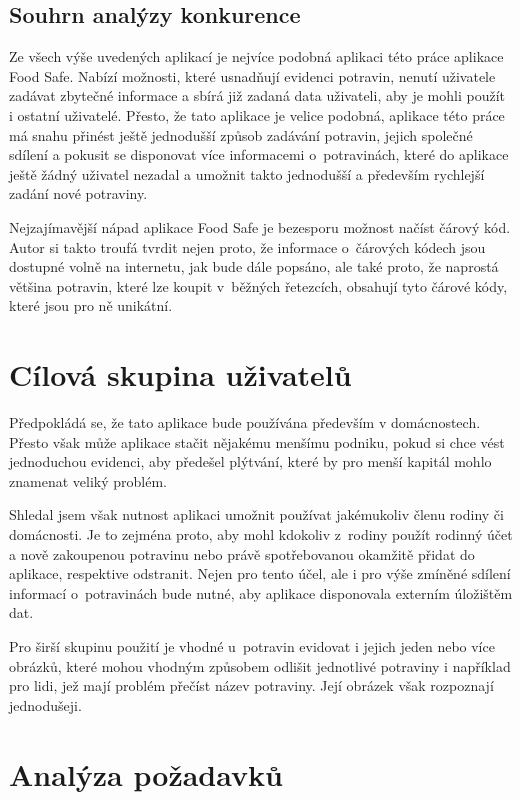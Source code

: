 \documentclass[thesis=B,czech]{FITthesis}[2013/10/20]
\begin{document}
\subsection{Souhrn analýzy konkurence}

Ze všech výše uvedených aplikací je nejvíce podobná aplikaci této práce aplikace Food Safe. Nabízí možnosti, které usnadňují evidenci potravin, nenutí uživatele zadávat zbytečné informace a sbírá již zadaná data uživateli, aby je mohli použít i ostatní uživatelé. Přesto, že tato aplikace je velice podobná, aplikace této práce má snahu přinést ještě jednodušší způsob zadávání potravin, jejich společné sdílení a pokusit se disponovat více informacemi o~potravinách, které do aplikace ještě žádný uživatel nezadal a umožnit takto jednodušší a především rychlejší zadání nové potraviny.

Nejzajímavější nápad aplikace Food Safe je bezesporu možnost načíst čárový kód. Autor si takto troufá tvrdit nejen proto, že informace o~čárových kódech jsou dostupné volně na internetu, jak bude dále popsáno, ale také proto, že naprostá většina potravin, které lze koupit v~běžných řetezcích, obsahují tyto čárové kódy, které jsou pro ně unikátní.

\section{Cílová skupina uživatelů}

Předpokládá se, že tato aplikace bude používána především v domácnostech. Přesto však může aplikace stačit nějakému menšímu podniku, pokud si chce vést jednoduchou evidenci, 
aby předešel plýtvání, které by pro menší kapitál mohlo znamenat veliký problém.

Shledal jsem však nutnost aplikaci umožnit používat jakémukoliv členu rodiny či domácnosti. Je to zejména proto, aby mohl kdokoliv z~rodiny použít rodinný účet a nově zakoupenou potravinu nebo právě spotřebovanou okamžitě přidat do aplikace, respektive odstranit. Nejen pro tento účel, ale i pro výše zmíněné sdílení informací o~potravinách bude nutné, aby aplikace disponovala externím úložištěm dat.

Pro širší skupinu použití je vhodné u~potravin evidovat i jejich jeden nebo více obrázků, které mohou vhodným způsobem odlišit jednotlivé potraviny i například pro lidi, jež mají problém přečíst název potraviny. Její obrázek však rozpoznají jednodušeji.

\clearpage

\section{Analýza požadavků}
\end{document}
